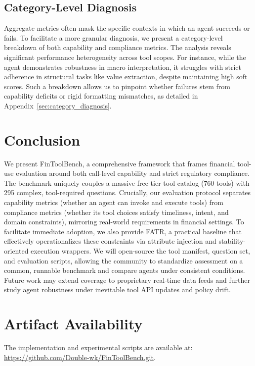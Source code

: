 \documentclass[sigconf,nonacm]{acmart}
\begin{document}
\subsection{Category-Level Diagnosis}
Aggregate metrics often mask the specific contexts in which an agent succeeds or fails. To facilitate a more granular diagnosis, we present a category-level breakdown of both capability and compliance metrics. The analysis reveals significant performance heterogeneity across tool scopes. For instance, while the agent demonstrates robustness in macro interpretation, it struggles with strict adherence in structural tasks like value extraction, despite maintaining high soft scores. Such a breakdown allows us to pinpoint whether failures stem from capability deficits or rigid formatting mismatches, as detailed in Appendix~\ref{sec:category_diagnosis}.

\section{Conclusion}
We present FinToolBench, a comprehensive framework that frames financial tool-use evaluation around both call-level capability and strict regulatory compliance.
The benchmark uniquely couples a massive free-tier tool catalog (760 tools) with 295 complex, tool-required questions. 
Crucially, our evaluation protocol separates capability metrics (whether an agent can invoke and execute tools) from compliance metrics (whether its tool choices satisfy timeliness, intent, and domain constraints), mirroring real-world requirements in financial settings.
To facilitate immediate adoption, we also provide FATR, a practical baseline that effectively operationalizes these constraints via attribute injection and stability-oriented execution wrappers.
We will open-source the tool manifest, question set, and evaluation scripts, allowing the community to standardize assessment on a common, runnable benchmark and compare agents under consistent conditions.
Future work may extend coverage to proprietary real-time data feeds and further study agent robustness under inevitable tool API updates and policy drift.

\section*{Artifact Availability}
The implementation and experimental scripts are available at:
\url{https://github.com/Double-wk/FinToolBench.git}.

\balance



\clearpage
\appendix

\end{document}
